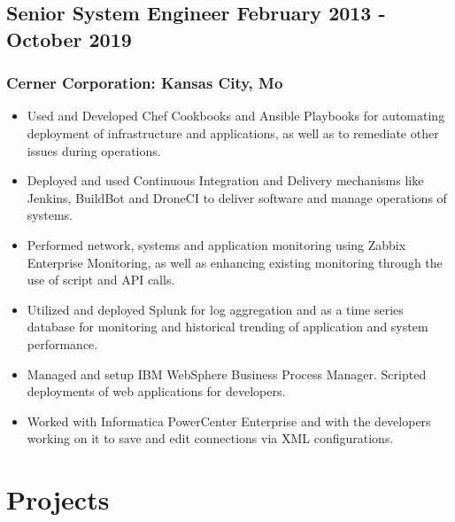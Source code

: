 \documentclass{article}
\begin{document}
    \subsection{Senior System Engineer {\hfill} February 2013 - October 2019}

      \subsubsection{Cerner Corporation: Kansas City, Mo}

        \begin{scriptsize}
        \begin{itemize}

          \item Used and Developed Chef Cookbooks and Ansible Playbooks for
            automating deployment of infrastructure and applications, as well
            as to remediate other issues during operations.

          \item Deployed and used Continuous Integration and Delivery
            mechanisms like Jenkins, BuildBot and DroneCI to deliver software
            and manage operations of systems.

          \item Performed network, systems and application monitoring using
            Zabbix Enterprise Monitoring, as well as enhancing existing
            monitoring through the use of script and API calls.

          \item Utilized and deployed Splunk for log aggregation and as a time
            series database for monitoring and historical trending of
            application and system performance.

          \item Managed and setup IBM WebSphere Business Process Manager.
            Scripted deployments of web applications for developers.

          \item Worked with Informatica PowerCenter Enterprise and with the
            developers working on it to save and edit connections via XML
            configurations.

        \end{itemize}
        \end{scriptsize}

  \section{Projects}
\end{document}

